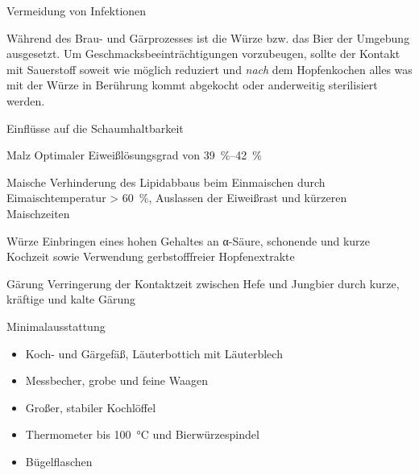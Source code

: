 \documentclass[9pt, ngerman]{beamer}
\begin{document}
\begin{frame}{Vermeidung von Infektionen}

  Während des Brau- und Gärprozesses ist die Würze bzw. das Bier der Umgebung
  ausgesetzt. Um Geschmacksbeeinträchtigungen vorzubeugen, sollte der Kontakt
  mit Sauerstoff soweit wie möglich reduziert und \emph{nach} dem Hopfenkochen
  alles was mit der Würze in Berührung kommt abgekocht oder anderweitig
  sterilisiert werden.

\end{frame}
\begin{frame}{Einflüsse auf die Schaumhaltbarkeit}
  \begin{block}{Malz}
    \vspace{0.5em}
    Optimaler Eiweißlösungsgrad von \SIrange{39}{42}{\percent}
  \end{block}
  \begin{block}{Maische}
    \vspace{0.5em}
    Verhinderung des Lipidabbaus beim Einmaischen durch Eimaischtemperatur >
    \SI{60}{\percent}, Auslassen der Eiweißrast und kürzeren Maischzeiten
  \end{block}
  \begin{block}{Würze}
    \vspace{0.5em}
    Einbringen eines hohen Gehaltes an α-Säure, schonende und kurze
    Kochzeit sowie Verwendung gerbstofffreier Hopfenextrakte
  \end{block}
  \begin{block}{Gärung}
    \vspace{0.5em}
    Verringerung der Kontaktzeit zwischen Hefe und Jungbier durch kurze,
    kräftige und kalte Gärung
  \end{block}
\end{frame}
\begin{frame}{Minimalausstattung}
  \begin{itemize}
    \item Koch- und Gärgefäß, Läuterbottich mit Läuterblech
    \item Messbecher, grobe und feine Waagen
    \item Großer, stabiler Kochlöffel
    \item Thermometer bis \SI{100}{\celsius} und Bierwürzespindel
    \item Bügelflaschen
  \end{itemize}
\end{frame}
\end{document}
